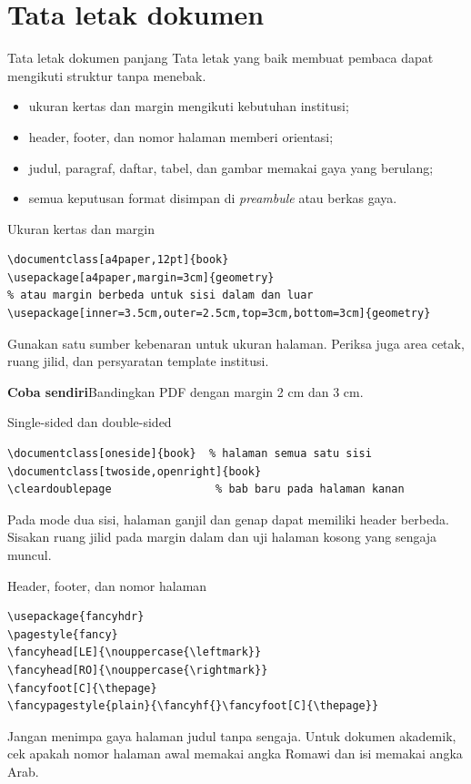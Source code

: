 \documentclass[aspectratio=169,11pt]{beamer}
\newcommand{\tugas}[1]{\par\medskip\alert{\textbf{Coba sendiri}}\quad #1}
\begin{document}
\section{Tata letak dokumen}
\begin{frame}{Tata letak dokumen panjang}
Tata letak yang baik membuat pembaca dapat mengikuti struktur tanpa menebak.
\medskip
\begin{itemize}
\item ukuran kertas dan margin mengikuti kebutuhan institusi;
\item header, footer, dan nomor halaman memberi orientasi;
\item judul, paragraf, daftar, tabel, dan gambar memakai gaya yang berulang;
\item semua keputusan format disimpan di \emph{preambule} atau berkas gaya.
\end{itemize}
\end{frame}
\begin{frame}[fragile]{Ukuran kertas dan margin}
\begin{lstlisting}
\documentclass[a4paper,12pt]{book}
\usepackage[a4paper,margin=3cm]{geometry}
% atau margin berbeda untuk sisi dalam dan luar
\usepackage[inner=3.5cm,outer=2.5cm,top=3cm,bottom=3cm]{geometry}
\end{lstlisting}
Gunakan satu sumber kebenaran untuk ukuran halaman. Periksa juga area cetak,
ruang jilid, dan persyaratan template institusi.
\tugas{Bandingkan PDF dengan margin 2 cm dan 3 cm.}
\end{frame}
\begin{frame}[fragile]{Single-sided dan double-sided}
\begin{lstlisting}
\documentclass[oneside]{book}  % halaman semua satu sisi
\documentclass[twoside,openright]{book}
\cleardoublepage                % bab baru pada halaman kanan
\end{lstlisting}
Pada mode dua sisi, halaman ganjil dan genap dapat memiliki header berbeda.
Sisakan ruang jilid pada margin dalam dan uji halaman kosong yang sengaja muncul.
\end{frame}
\begin{frame}[fragile]{Header, footer, dan nomor halaman}
\begin{lstlisting}
\usepackage{fancyhdr}
\pagestyle{fancy}
\fancyhead[LE]{\nouppercase{\leftmark}}
\fancyhead[RO]{\nouppercase{\rightmark}}
\fancyfoot[C]{\thepage}
\fancypagestyle{plain}{\fancyhf{}\fancyfoot[C]{\thepage}}
\end{lstlisting}
Jangan menimpa gaya halaman judul tanpa sengaja. Untuk dokumen akademik,
cek apakah nomor halaman awal memakai angka Romawi dan isi memakai angka Arab.
\end{frame}
\end{document}

